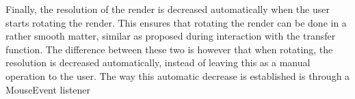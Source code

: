 Finally, the resolution of the render is decreased automatically when the user starts rotating the render. This ensures that rotating the render can be done in a rather smooth matter, similar as proposed during interaction with the transfer function. The difference between these two is however that when rotating, the resolution is decreased automatically, instead of leaving this as a manual operation to the user. The way this automatic decrease is established is through a MouseEvent listener 

